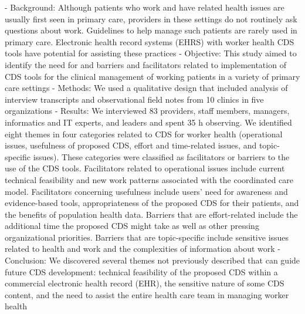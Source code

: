 - Background: Although patients who work and have related health issues are usually first seen in primary care, providers in these settings do not routinely ask questions about work. Guidelines to help manage such patients are rarely used in primary care. Electronic health record systems (EHRS) with worker health CDS tools have potential for assisting these practices
- Objective: This study aimed to identify the need for and barriers and facilitators related to implementation of CDS tools for the clinical management of working patients in a variety of primary care settings
- Methods: We used a qualitative design that included analysis of interview transcripts and observational field notes from 10 clinics in five organizations
- Results: We interviewed 83 providers, staff members, managers, informatics and IT experts, and leaders and spent 35 h observing. We identified eight themes in four categories related to CDS for worker health (operational issues, usefulness of proposed CDS, effort and time-related issues, and topic-specific issues). These categories were classified as facilitators or barriers to the use of the CDS tools. Facilitators related to operational issues include current technical feasibility and new work patterns associated with the coordinated care model. Facilitators concerning usefulness include users' need for awareness and evidence-based tools, appropriateness of the proposed CDS for their patients, and the benefits of population health data. Barriers that are effort-related include the additional time the proposed CDS might take as well as other pressing organizational priorities. Barriers that are topic-specific include sensitive issues related to health and work and the complexities of information about work
- Conclusion: We discovered several themes not previously described that can guide future CDS development: technical feasibility of the proposed CDS within a commercial electronic health record (EHR), the sensitive nature of some CDS content, and the need to assist the entire health care team in managing worker health

